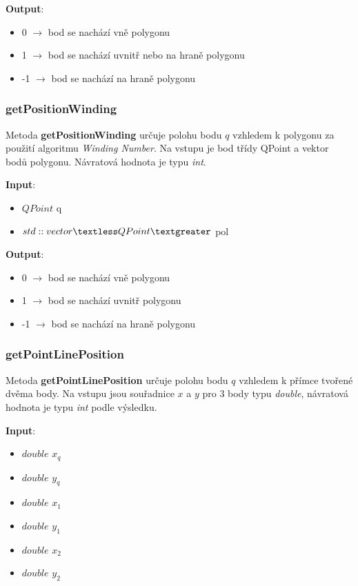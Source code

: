 \documentclass[a4paper, 12pt]{article}
\begin{document}
\textbf{Output}:
\begin{itemize}
\item 0 $\rightarrow$ bod se nachází vně polygonu
\item 1 $\rightarrow$ bod se nachází uvnitř nebo na hraně polygonu
\item -1 $\rightarrow$ bod se nachází na hraně polygonu
\end{itemize}

\subsubsection{getPositionWinding}
Metoda \textbf{getPositionWinding} určuje polohu bodu $q$ vzhledem k polygonu za použití algoritmu \textsl{Winding Number}. Na vstupu je bod třídy QPoint a vektor bodů polygonu. Návratová hodnota je typu \textsl{int}.

\textbf{Input}:
\begin{itemize}
\item $QPoint$ q
\item $std::vector\textless QPoint\textgreater$ pol
\end{itemize}

\textbf{Output}:
\begin{itemize}
\item 0 $\rightarrow$ bod se nachází vně polygonu
\item 1 $\rightarrow$ bod se nachází uvnitř polygonu
\item -1 $\rightarrow$ bod se nachází na hraně polygonu
\end{itemize}

\subsubsection{getPointLinePosition}
Metoda \textbf{getPointLinePosition} určuje polohu bodu $q$ vzhledem k přímce tvořené dvěma body. Na vstupu jsou souřadnice $x$ a $y$ pro 3 body typu \textit{double}, návratová hodnota je typu \textit{int} podle výsledku. 

\textbf{Input}:
\begin{itemize}
\item $double$ $x_q$
\item $double$ $y_q$
\item $double$ $x_1$
\item $double$ $y_1$
\item $double$ $x_2$
\item $double$ $y_2$
\end{itemize}
\end{document}
